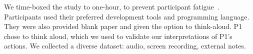 

We time-boxed the study to one-hour, to prevent participant fatigue~\cite{Easterbrook:2008}. Participants used their preferred development tools and programming language. They were also provided blank paper and given the option to think-aloud. P1 chose to think aloud, which we used to validate our interpretations of P1's actions. We collected a diverse dataset: audio, screen recording, external notes.




